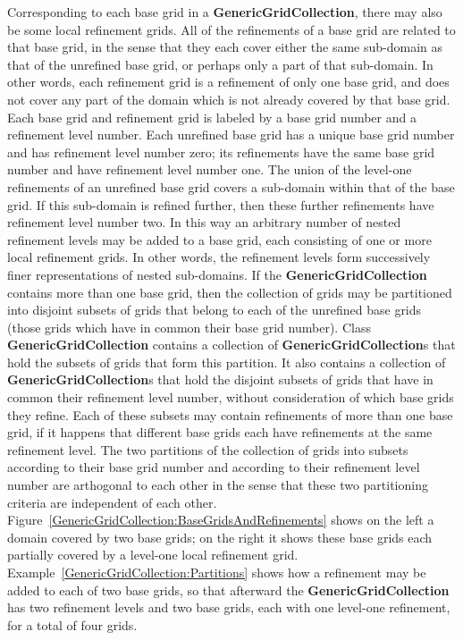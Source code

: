 \documentclass{article}
\begin{document}
Corresponding to each base grid in a \textbf{{}GenericGridCollection}, there may also be some local refinement grids.
All of the refinements of a base grid are related to that base grid, in the sense that they each cover either the same sub-domain as
that of the unrefined base grid, or perhaps only a part of that sub-domain.  In other words, each refinement grid is a refinement of only
one base grid, and does not cover any part of the domain which is not already covered by that base grid.  Each base grid and refinement
grid is labeled by a base grid number and a refinement level number.  Each unrefined base grid has a unique base grid number and has
refinement level number zero; its refinements have the same base grid number and have refinement level number one.  The union of the
level-one refinements of an unrefined base grid covers a sub-domain within that of the base grid.  If this sub-domain is refined further,
then these further refinements have refinement level number two.  In this way an arbitrary number of nested refinement levels may be added
to a base grid, each consisting of one or more local refinement grids.  In other words, the refinement levels form successively finer
representations of nested sub-domains.  If the \textbf{GenericGridCollection} contains more than one base grid, then the collection
of grids may be partitioned into disjoint subsets of grids that belong to each of the unrefined base grids (those grids which have in common
their base grid number).  Class \textbf{GenericGridCollection} contains a collection of \textbf{GenericGridCollection}s that
hold the subsets of grids that form this partition.  It also contains a collection of \textbf{GenericGridCollection}s that hold the
disjoint subsets of grids that have in common their refinement level number, without consideration of which base grids they refine.  Each of
these subsets may contain refinements of more than one base grid, if it happens that different base grids each have refinements at the same
refinement level.  The two partitions of the collection of grids into subsets according to their base grid number and according to their
refinement level number are arthogonal to each other in the sense that these two partitioning criteria are independent of each other.
Figure~\ref{GenericGridCollection:BaseGridsAndRefinements} shows on the left a domain covered by two base grids; on the right it shows these
base grids each partially covered by a level-one local refinement grid.  Example~\ref{GenericGridCollection:Partitions} shows how a
refinement may be added to each of two base grids, so that afterward the \textbf{GenericGridCollection} has two refinement levels
and two base grids, each with one level-one refinement, for a total of four grids.
\end{document}
